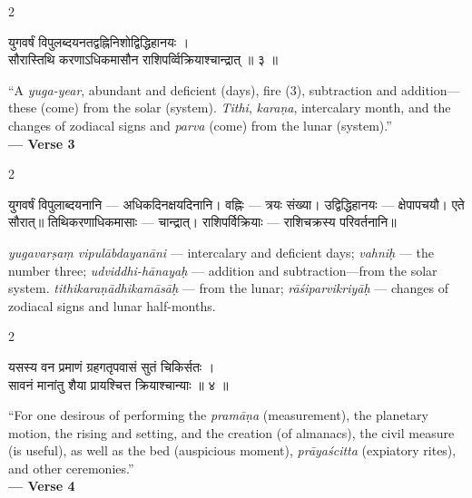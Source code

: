 \documentclass[11pt,a4paper]{article}
\newcommand{\dev}[1]{{\devanagarifont #1}}
\newenvironment{bilingualverse}{%
  \begin{paracol}{2}
  \fontsize{10.5}{13}\selectfont
}{%
  \end{paracol}
  \vspace{0.3cm}
}
\begin{document}
\vspace{0.4cm}

\begin{bilingualverse}
\begin{leftcolumn*}
\dev{युगवर्षं विपुलब्दयनतद्वह्निनिशोद्विद्धिहानयः ।}\\
\dev{सौरास्तिथि करणाऽधिकमासौन राशिपर्व्विक्रियाश्चान्द्रात् ॥ ३ ॥}
\end{leftcolumn*}
\begin{rightcolumn}
``A \textit{yuga-year}, abundant and deficient (days), fire (3), subtraction and addition---these (come) from the solar (system). \textit{Tithi}, \textit{karaṇa}, intercalary month, and the changes of zodiacal signs and \textit{parva} (come) from the lunar (system).''\\[0.3cm]
\hfill\textbf{— Verse 3}
\end{rightcolumn}
\end{bilingualverse}

\begin{paracol}{2}
\begin{leftcolumn*}
\dev{युगवर्षं विपुलाब्दयनानि} — अधिकदिनक्षयदिनानि। \dev{वह्निः} — त्रयः संख्या। \dev{उद्विद्धिहानयः} — क्षेपापचयौ। एते सौरात्॥ \dev{तिथिकरणाधिकमासाः} — चान्द्रात्। \dev{राशिपर्विक्रियाः} — राशिचक्रस्य परिवर्तनानि॥
\end{leftcolumn*}
\begin{rightcolumn}
\textit{yugavarṣaṃ vipulābdayanāni} — intercalary and deficient days; \textit{vahniḥ} — the number three; \textit{udviddhi-hānayaḥ} — addition and subtraction---from the solar system. \textit{tithikaraṇādhikamāsāḥ} --- from the lunar; \textit{rāśiparvikriyāḥ} --- changes of zodiacal signs and lunar half-months.
\end{rightcolumn}
\end{paracol}

\vspace{0.4cm}

\begin{bilingualverse}
\begin{leftcolumn*}
\dev{यसस्य वन प्रमाणं ग्रहगतृपवासं सुतं चिकिर्सतः ।}\\
\dev{सावनं मानांतु शैया प्रायश्चित्त क्रियाश्चान्याः ॥ ४ ॥}
\end{leftcolumn*}
\begin{rightcolumn}
``For one desirous of performing the \textit{pramāṇa} (measurement), the planetary motion, the rising and setting, and the creation (of almanacs), the civil measure (is useful), as well as the bed (auspicious moment), \textit{prāyaścitta} (expiatory rites), and other ceremonies.''\\[0.3cm]
\hfill\textbf{— Verse 4}
\end{rightcolumn}
\end{bilingualverse}
\end{document}

